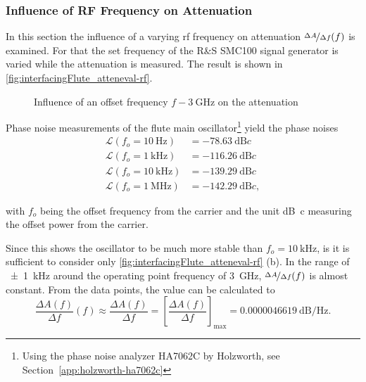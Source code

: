 \newpage
\subsubsection{Influence of RF Frequency on Attenuation}
In this section the influence of a varying \gls{rf} frequency on attenuation $\nicefrac{\Delta A}{\Delta f} (f)$ is examined. For that the set frequency of the R\&S SMC100 signal generator is varied while the attenuation is measured. The result is shown in \autoref{fig:interfacingFlute_atteneval-rf}.

\begin{figure}[H]
    \centering
        \subfloat[$f=f_o \SI{+-30}{\kHz}$]{}
        \qquad
        \subfloat[$f=f_o \SI{+-1}{\kHz}$]{}
       \caption[Influence of an offset frequency on attenuation]{Influence of an offset frequency $f-\SI{3}{\GHz}$ on the attenuation }
    \label{fig:interfacingFlute_atteneval-rf}
\end{figure}

Phase noise measurements of the \gls{flute} main oscillator\footnote{Using the phase noise analyzer HA7062C by Holzworth, see Section~\ref{app:holzworth-ha7062c}} yield the phase noises
\begin{align}
\mathscr{L}(f_o=\SI{10}{\hertz}) &= \SI{-78.63}{\dB c}\\
\mathscr{L}(f_o=\SI{1}{\kilo\hertz}) &= \SI{-116.26}{\dB c}\\
\mathscr{L}(f_o=\SI{10}{\kilo\hertz}) &= \SI{-139.29}{\dB c}\\
\mathscr{L}(f_o=\SI{1}{\mega\hertz}) &= \SI{-142.29}{\dB c},
\end{align}

with $f_o$ being the offset frequency from the carrier and the unit \si{\dB c} measuring the offset power from the carrier.

Since this shows the oscillator to be much more stable than $f_o=\SI{10}{\kHz}$, is it is sufficient to consider only \autoref{fig:interfacingFlute_atteneval-rf} (b). In the range of \SI{\pm1}{\kHz} around the operating point frequency of \SI{3}{\GHz}, $\nicefrac{\Delta A}{\Delta f} (f)$ is almost constant. From the data points, the value can be calculated to
\begin{equation}
\frac{\Delta A(f)}{\Delta f}(f) 
\approx \frac{\Delta A(f)}{\Delta f} 
= \left[\frac{\Delta A(f)}{\Delta f}\right]_\text{max}
=\SI{0.0000046619}{\dB\per\hertz}.
\end{equation}


